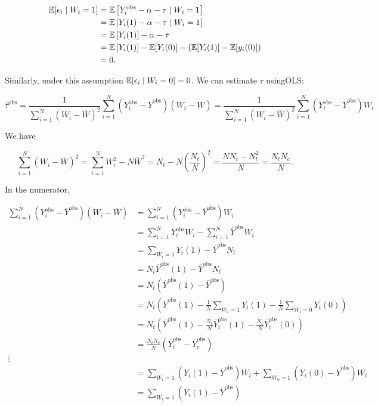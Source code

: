 \begin{align*}
\E[\epsilon_i \mid W_i = 1] & = \E \left[ Y_i^{\text{obs}} - \alpha - \tau \mid W_i = 1\right]
\\ & = \E \left[ Y_i(1) - \alpha - \tau \mid W_i = 1\right]
\\ & = \E \left[ Y_i(1) \right] - \alpha - \tau
\\ & = \E \left[ Y_i(1) \right] - \E[Y_i(0)]  -(\E[Y_i(1)] - \E[y_i(0)])
\\ & = 0.
\end{align*}

Similarly, under this assumption \(\E[\epsilon_i \mid W_i = 0] = 0\). We can estimate \(\tau\) usingOLS:

\[
\hat{\tau}^{\text{obs}} = \frac{1}{\sum_{i=1}^N (W_i - \overline{W})^2} \sum_{i=1}^N(Y_i^{\text{obs}} - \overline{Y}^{\text{obs}})(W_i - \overline{W}) = \frac{1}{\sum_{i=1}^N (W_i - \overline{W})^2} \sum_{i=1}^N(Y_i^{\text{obs}} - \overline{Y}^{\text{obs}})W_i
\]

We have

\[
\sum_{i=1}^N(W_i - \overline{W})^2 = \sum_{i=1}^N W_i^2 - N \overline{W}^2 = N_t - N \left( \frac{N_t}{N} \right)^2 = \frac{N N_t - N_t^2}{N} = \frac{N_t N_c}{N}.
\]

In the numerator,

\begin{align*}
 \sum_{i=1}^N(Y_i^{\text{obs}} - \overline{Y}^{\text{obs}})(W_i - \overline{W}) & = \sum_{i=1}^N(Y_i^{\text{obs}} - \overline{Y}^{\text{obs}})W_i
 \\ & = \sum_{i=1}^N Y_i^{\text{obs}} W_i  -   \sum_{i=1}^N \overline{Y}^{\text{obs}}W_i
  \\ & = \sum_{W_i=1} Y_i(1)   -    \overline{Y}^{\text{obs}}N_t
    \\ & =N_t \overline{Y}^{\text{obs}}(1)   -    \overline{Y}^{\text{obs}}N_t
\\ & =N_t \left( \overline{Y}^{\text{obs}}(1)   -    \overline{Y}^{\text{obs}}\right)
\\ & =N_t \left( \overline{Y}^{\text{obs}}(1)   -     \frac{1}{N} \sum_{W_i = 1} Y_i(1) - \frac{1}{N} \sum_{W_i = 0} Y_i(0) \right)
\\ & =N_t \left( \overline{Y}^{\text{obs}}(1)   -     \frac{N_t}{N}  
\overline{Y}_i^{\text{obs}}(1) - \frac{N_c}{N} \overline{Y}_i^{\text{obs}}(0) \right)
\\ & = \frac{N_t N_c}{N} \left( \overline{Y}_t^{\text{obs}} - \overline{Y}_c^{\text{obs}} \right)
 \\ \vdots
 \\ & = \sum_{W_i =1}(Y_i(1) - \overline{Y}^{\text{obs}})W_i +   \sum_{W_0 =1}(Y_i(0) - \overline{Y}^{\text{obs}})W_i 
  \\ & = \sum_{W_i =1}(Y_i(1) - \overline{Y}^{\text{obs}})
\end{align*}

